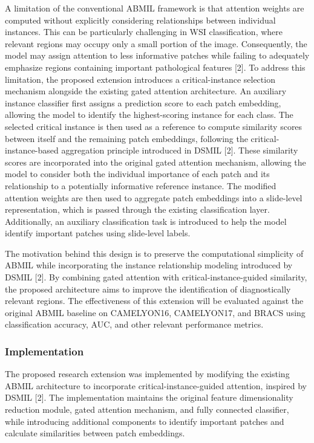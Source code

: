 \documentclass[journal]{IEEEtran}
\begin{document}
A limitation of the conventional ABMIL framework is that attention weights are computed without explicitly considering relationships between individual instances. This can be particularly challenging in WSI classification, where relevant regions may occupy only a small portion of the image. Consequently, the model may assign attention to less informative patches while failing to adequately emphasize regions containing important pathological features [2]. To address this limitation, the proposed extension introduces a critical-instance selection mechanism alongside the existing gated attention architecture. An auxiliary instance classifier first assigns a prediction score to each patch embedding, allowing the model to identify the highest-scoring instance for each class. The selected critical instance is then used as a reference to compute similarity scores between itself and the remaining patch embeddings, following the critical-instance-based aggregation principle introduced in DSMIL [2]. These similarity scores are incorporated into the original gated attention mechanism, allowing the model to consider both the individual importance of each patch and its relationship to a potentially informative reference instance. The modified attention weights are then used to aggregate patch embeddings into a slide-level representation, which is passed through the existing classification layer. Additionally, an auxiliary classification task is introduced to help the model identify important patches using slide-level labels.

The motivation behind this design is to preserve the computational simplicity of ABMIL while incorporating the instance relationship modeling introduced by DSMIL [2]. By combining gated attention with critical-instance-guided similarity, the proposed architecture aims to improve the identification of diagnostically relevant regions. The effectiveness of this extension will be evaluated against the original ABMIL baseline on CAMELYON16, CAMELYON17, and BRACS using classification accuracy, AUC, and other relevant performance metrics.

\subsubsection{Implementation}
The proposed research extension was implemented by modifying the existing ABMIL architecture to incorporate critical-instance-guided attention, inspired by DSMIL [2]. The implementation maintains the original feature dimensionality reduction module, gated attention mechanism, and fully connected classifier, while introducing additional components to identify important patches and calculate similarities between patch embeddings.
\end{document}
